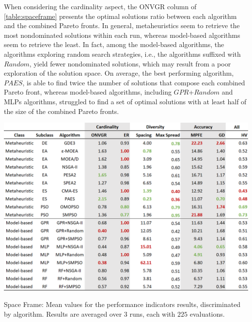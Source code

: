 When considering the cardinality aspect, the \ac{ONVGR} column of \cref{table:spaceframe} presents the optimal solutions ratio between each algorithm and the combined Pareto fronts. In general, metaheuristics seem to retrieve the most nondominated solutions within each run, whereas model-based algorithms seem to retrieve the least. In fact, among the model-based algorithms, the algorithms exploring random search strategies, i.e., the algorithms suffixed with $Random$, yield fewer nondominated solutions, which may result from a poor exploration of the solution space. On average, the best performing algorithm, $PAES$, is able to find twice the number of solutions that compose each combined Pareto front, whereas model-based algorithms, including $GPR$+$Random$ and \acp{MLP} algorithms, struggled to find a set of optimal solutions with at least half of the size of the combined Pareto fronts. 

\begin{table}[h!]
	\centering
	\includegraphics[width=\textwidth]{Images/Evaluation/caadria/Results_Mean_20190428.PNG}
	\caption[Space Frame: Mean values for the performance indicators results, discriminated per algorithms]{Space Frame: Mean values for the performance indicators results, discriminated by algorithm. Results are averaged over $3$ runs, each with $225$ evaluations.}
	\label{table:spaceframe}
\end{table}

